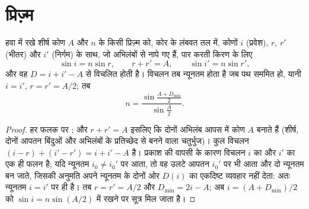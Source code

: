 \section{प्रिज़्म}

\begin{proposition}[प्रिज़्म के सूत्र]\label{prop:b1:rays-reflection-refraction:prism}
हवा में रखे शीर्ष कोण $A$ और  $n$ के किसी प्रिज़्म को, कोर के लंबवत
तल में, कोणों $i$ (प्रवेश), $r$, $r'$ (भीतर) और $i'$ (निर्गम) के साथ, जो
अभिलंबों से नापे गए हैं, पार करती किरण के लिए
\[
\sin i = n \sin r, \qquad r + r' = A, \qquad \sin i' = n \sin r',
\]
और वह $D = i + i' - A$ से विचलित होती है। विचलन तब न्यूनतम होता है जब पथ
सममित हो, यानी $i = i'$, $r = r' = A/2$; तब
\[
n = \frac{\sin\frac{A + D_{\min}}{2}}{\sin\frac{A}{2}} .
\]
\end{proposition}

\begin{proof}
हर फलक पर ; और $r + r' = A$ इसलिए कि दोनों अभिलंब आपस में कोण
$A$ बनाते हैं (शीर्ष, दोनों आपतन बिंदुओं और अभिलंबों के प्रतिच्छेद से बनने
वाला चतुर्भुज)। कुल विचलन $(i - r) + (i' - r') = i + i' - A$ है। प्रकाश की
वापसी के कारण विचलन $i$ का और $i'$ का एक ही फलन है; यदि न्यूनतम
$i_0 \neq i_0'$ पर आता, तो वह उलटे आपतन $i_0'$ पर भी आता और दो न्यूनतम बन
जाते, जिसकी अनुमति अपने न्यूनतम के दोनों ओर $D(i)$ का एकदिष्ट व्यवहार नहीं
देता: अतः न्यूनतम $i = i'$ पर ही है।
तब $r = r' = A/2$ और $D_{\min} = 2i - A$; अब $i = (A +
D_{\min})/2$ को $\sin i = n\sin(A/2)$ में रखने पर सूत्र मिल जाता है।
\end{proof}

